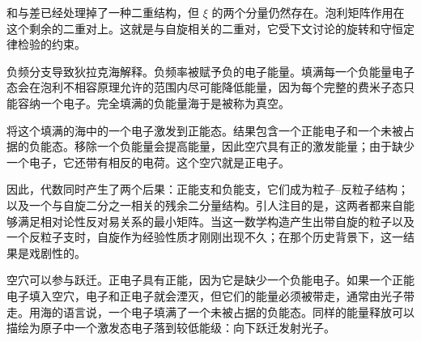 和与差已经处理掉了一种二重结构，但 \(\xi\) 的两个分量仍然存在。泡利矩阵作用在这个剩余的二重对上。这就是与自旋相关的二重对，它受下文讨论的旋转和守恒定律检验的约束。

\begin{classroomqa}
\end{classroomqa}

负频分支导致狄拉克海解释。负频率被赋予负的电子能量。填满每一个负能量电子态会在泡利不相容原理允许的范围内尽可能降低能量，因为每个完整的费米子态只能容纳一个电子。完全填满的负能量海于是被称为真空。

将这个填满的海中的一个电子激发到正能态。结果包含一个正能电子和一个未被占据的负能态。移除一个负能量会提高能量，因此空穴具有正的激发能量；由于缺少一个电子，它还带有相反的电荷。这个空穴就是正电子。

\begin{classroomqa}
\end{classroomqa}

因此，代数同时产生了两个后果：正能支和负能支，它们成为粒子--反粒子结构；以及一个与自旋二分之一相关的残余二分量结构。引人注目的是，这两者都来自能够满足相对论性反对易关系的最小矩阵。当这一数学构造产生出带自旋的粒子以及一个反粒子支时，自旋作为经验性质才刚刚出现不久；在那个历史背景下，这一结果是戏剧性的。

\begin{classroomqa}
\end{classroomqa}

空穴可以参与跃迁。正电子具有正能，因为它是缺少一个负能电子。如果一个正能电子填入空穴，电子和正电子就会湮灭，但它们的能量必须被带走，通常由光子带走。用海的语言说，一个电子填满了一个未被占据的负能态。同样的能量释放可以描绘为原子中一个激发态电子落到较低能级：向下跃迁发射光子。

\begin{classroomqa}
\end{classroomqa}

